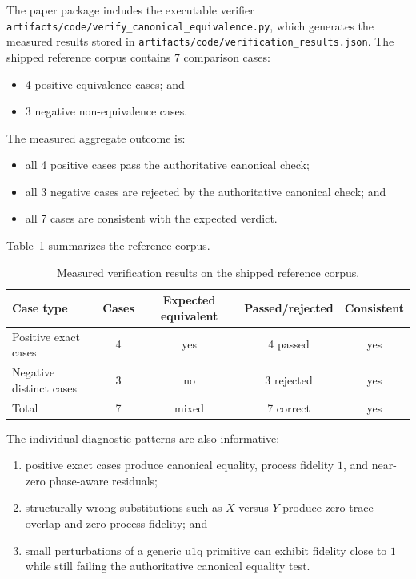 \documentclass[11pt]{article}
\theoremstyle{remark}
\newcommand{\uoneq}{\mathrm{u1q}}
\begin{document}
The paper package includes the executable verifier
\texttt{artifacts/code/verify\_canonical\_equivalence.py}, which generates the
measured results stored in \texttt{artifacts/code/verification\_results.json}.
The shipped reference corpus contains 7 comparison cases:
\begin{itemize}[leftmargin=1.5em]
\item 4 positive equivalence cases; and
\item 3 negative non-equivalence cases.
\end{itemize}

The measured aggregate outcome is:
\begin{itemize}[leftmargin=1.5em]
\item all 4 positive cases pass the authoritative canonical check;
\item all 3 negative cases are rejected by the authoritative canonical check; and
\item all 7 cases are consistent with the expected verdict.
\end{itemize}

Table~\ref{tab:verification-results} summarizes the reference corpus.

\begin{table}[h]
\centering
\begin{tabular}{@{}lcccc@{}}
\toprule
Case type & Cases & Expected equivalent & Passed/rejected & Consistent \\
\midrule
Positive exact cases & 4 & yes & 4 passed & yes \\
Negative distinct cases & 3 & no & 3 rejected & yes \\
\midrule
Total & 7 & mixed & 7 correct & yes \\
\bottomrule
\end{tabular}
\caption{Measured verification results on the shipped reference corpus.}
\label{tab:verification-results}
\end{table}

The individual diagnostic patterns are also informative:
\begin{enumerate}[label=(\arabic*), leftmargin=1.5em]
\item positive exact cases produce canonical equality, process fidelity $1$, and
near-zero phase-aware residuals;
\item structurally wrong substitutions such as $X$ versus $Y$ produce zero
trace overlap and zero process fidelity; and
\item small perturbations of a generic $\uoneq$ primitive can exhibit fidelity
close to $1$ while still failing the authoritative canonical equality test.
\end{enumerate}
\end{document}
